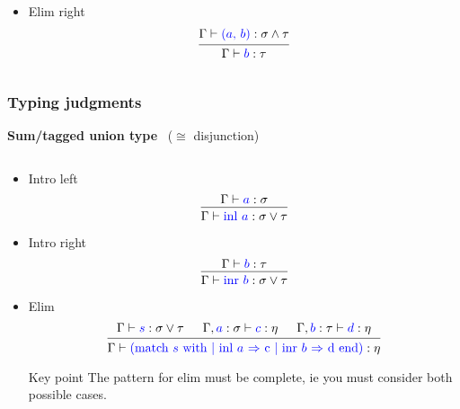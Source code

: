 \documentclass{beamer}
\begin{document}
\begin{frame}
\begin{columns}
\begin{column}{.5\textwidth}
\begin{itemize}[label=$\ast$]
      \item Elim right
      \[
        \begin{prooftree}
          \hypo{\Gamma \vdash {\color{blue} (a, \, b)} : \sigma \wedge
            \tau }
          \infer1{\Gamma \vdash {\color{blue} b} : \tau}
        \end{prooftree}
      \]
      \end{itemize}
      \endminipage
    \end{column}
  \end{columns}
\end{frame}

\begin{frame}
  \frametitle{Typing judgments}
  
  \qquad \qquad \quad \textbf{Sum/tagged union type} \, ($\cong$ disjunction)
  \begin{columns}
    \begin{column}{.7\textwidth}
      \vspace{0.05\textheight}
      \begin{itemize}[label=$\ast$]
      \item Intro left
      \[
        \begin{prooftree}
          \hypo{\Gamma \vdash {\color{blue} a} : \sigma}
          \infer1{\Gamma \vdash {\color{blue} \text{inl } a} : \sigma \vee \tau}
        \end{prooftree}
      \]

      \item Intro right
        \[
        \begin{prooftree}
          \hypo{\Gamma \vdash {\color{blue} b} : \tau}
          \infer1{\Gamma \vdash {\color{blue} \text{inr } b} : \sigma \vee \tau}
        \end{prooftree}
        \]

      \item Elim
        \[
        \begin{prooftree}
          \hypo{\Gamma \vdash {\color{blue} s} : \sigma \vee \tau}
          \hypo{\Gamma, {\color{blue} a} : \sigma \vdash {\color{blue} c} :
            \eta}
          \hypo{\Gamma, {\color{blue} b} : \tau \vdash {\color{blue} d} : \eta}
          \infer3{\Gamma \vdash 
            {\color{blue} (\text{match $s$ with $\vert$ inl $a$ $\Rightarrow$ c $\vert$
                inr $b$ $\Rightarrow$ d end)}} : \eta}
        \end{prooftree}
        \]

        \begin{block} {Key point}
          The pattern for elim must be \alert{complete}, ie you must consider
          both possible cases.
        \end{block}
      \end{itemize}
    \end{column}
  \end{columns}
\end{frame}
\end{document}
